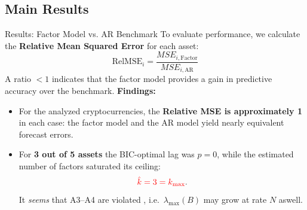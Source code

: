 \documentclass{beamer}
\begin{document}
\subsection{Main Results}

\begin{frame}{Results: Factor Model vs. AR Benchmark}
    To evaluate performance, we calculate the \textbf{Relative Mean Squared Error} for each asset:
    \begin{equation*}
        \text{RelMSE}_i = \frac{MSE_{i, \text{Factor}}}{MSE_{i, \text{AR}}}
    \end{equation*}
    A ratio $< 1$ indicates that the factor model provides a gain in predictive accuracy over the benchmark.
 \vspace{-0.12cm}
    \textbf{Findings:}
    \vspace{0.12cm}
    \begin{itemize}
        \item For the analyzed cryptocurrencies, the \textbf{Relative MSE is approximately 1} in each case: the factor model and the AR model yield nearly equivalent forecast errors.
        \item For \textbf{3 out of 5 assets} the BIC-optimal lag was \textbf{$p=0$}, while the estimated number of factors saturated its ceiling:
        \begin{equation*}
            \textcolor{red}{\hat{k} = 3 = k_{\max}}.
        \end{equation*}
       It \emph{seems} that A3--A4 are violated , i.e.\ $\lambda_{\max}(B)$ may grow at rate $N$ aswell.
    \end{itemize}
\end{frame}
\end{document}
